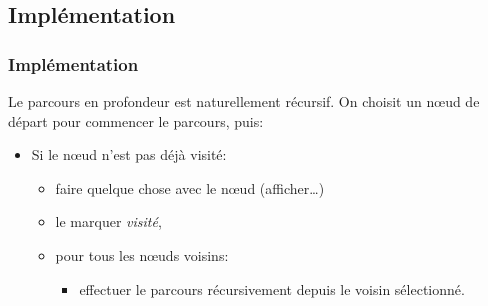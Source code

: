 \documentclass[svgnames,11pt]{beamer}
\begin{document}
\subsection{Implémentation}
\begin{frame}
    \frametitle{Implémentation}

    \begin{aretenir}[]
    Le parcours en profondeur est naturellement récursif. On choisit un nœud de départ pour commencer le parcours, puis:
    \begin{itemize}
        \item Si le nœud n'est pas déjà visité:
        \begin{itemize}
            \item faire quelque chose avec le nœud (afficher\dots)
            \item le marquer \emph{visité},
            \item pour tous les nœuds voisins:
            \begin{itemize}
                \item effectuer le parcours récursivement depuis le voisin sélectionné.
            \end{itemize}
        \end{itemize}
    \end{itemize}
    \end{aretenir}

\end{frame}
\end{document}
